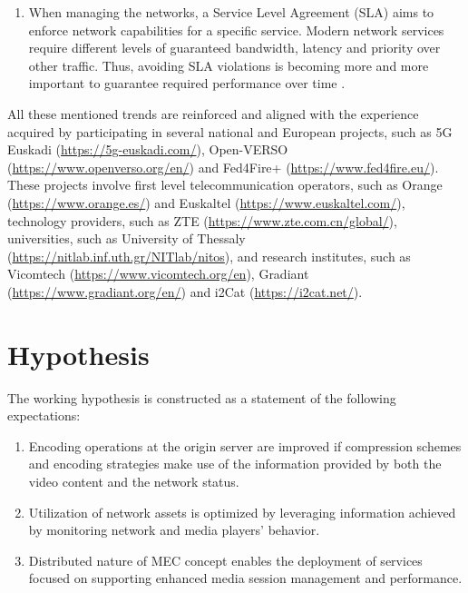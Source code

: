 \begin{enumerate}
	\item When managing the networks, a Service Level Agreement (SLA) aims to enforce network capabilities for a specific service. Modern network services require different levels of guaranteed bandwidth, latency and priority over other traffic. Thus, avoiding SLA violations is becoming more and more important to guarantee required performance over time \cite{badshah2020performance}.
	
\end{enumerate}

All these mentioned trends are reinforced and aligned with the experience acquired by participating in several national and European projects, such as 5G \hbox{Euskadi} (\url{https://5g-euskadi.com/}), Open-VERSO (\url{https://www.openverso.org/en/}) and Fed4Fire+ (\url{https://www.fed4fire.eu/}). These projects involve first level telecommunication operators, such as Orange (\url{https://www.orange.es/}) and Euskaltel (\url{https://www.euskaltel.com/}), technology providers, such as ZTE (\url{https://www.zte.com.cn/global/}), universities, such as University of \hbox{Thessaly} (\url{https://nitlab.inf.uth.gr/NITlab/nitos}), and research institutes, such as Vicomtech (\url{https://www.vicomtech.org/en}), Gradiant (\url{https://www.gradiant.org/en/}) and i2Cat (\url{https://i2cat.net/}).

\section{Hypothesis}

The working hypothesis is constructed as a statement of the following expectations:

\begin{enumerate}
	\item Encoding operations at the origin server are improved if compression schemes and encoding strategies make use of the information provided by both the video content and the network status.
	\item Utilization of network assets is optimized by leveraging information achieved by monitoring network and media players' behavior.
	\item Distributed nature of MEC concept enables the deployment of services focused on supporting enhanced media session management and performance.
\end{enumerate}

